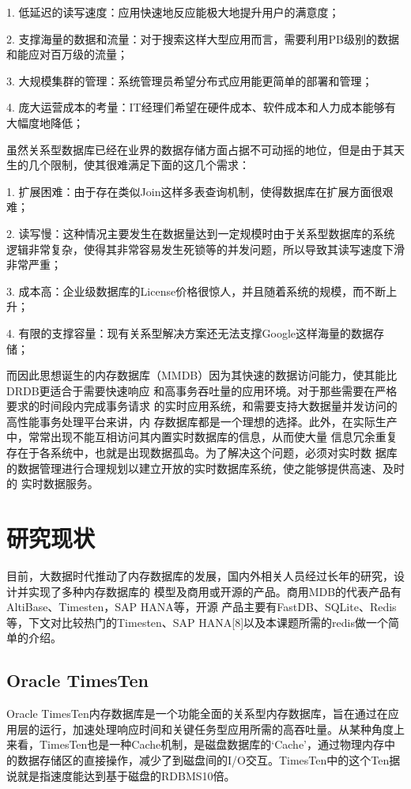 \documentclass[proposal]{zjutreport}
\begin{document}
1. 低延迟的读写速度：应用快速地反应能极大地提升用户的满意度；

2. 支撑海量的数据和流量：对于搜索这样大型应用而言，需要利用PB级别的数据和能应对百万级的流量；

3. 大规模集群的管理：系统管理员希望分布式应用能更简单的部署和管理；

4. 庞大运营成本的考量：IT经理们希望在硬件成本、软件成本和人力成本能够有大幅度地降低；

虽然关系型数据库已经在业界的数据存储方面占据不可动摇的地位，但是由于其天生的几个限制，使其很难满足下面的这几个需求：

1. 扩展困难：由于存在类似Join这样多表查询机制，使得数据库在扩展方面很艰难；

2. 读写慢：这种情况主要发生在数据量达到一定规模时由于关系型数据库的系统逻辑非常复杂，使得其非常容易发生死锁等的并发问题，所以导致其读写速度下滑非常严重；

3. 成本高：企业级数据库的License价格很惊人，并且随着系统的规模，而不断上升；

4. 有限的支撑容量：现有关系型解决方案还无法支撑Google这样海量的数据存储；

而因此思想诞生的内存数据库（MMDB）因为其快速的数据访问能力，使其能比DRDB更适合于需要快速响应
和高事务吞吐量的应用环境。对于那些需要在严格要求的时间段内完成事务请求
的实时应用系统，和需要支持大数据量并发访问的高性能事务处理平台来讲，内
存数据库都是一个理想的选择。此外，在实际生产中，常常出现不能互相访问其内置实时数据库的信息，从而使大量
信息冗余重复存在于各系统中，也就是出现数据孤岛。为了解决这个问题，必须对实时数
据库的数据管理进行合理规划以建立开放的实时数据库系统，使之能够提供高速、及时的
实时数据服务。

\section{研究现状}
目前，大数据时代推动了内存数据库的发展，国内外相关人员经过长年的研究，设计并实现了多种内存数据库的
模型及商用或开源的产品。商用MDB的代表产品有AltiBase、Timesten，SAP HANA等，开源
产品主要有FastDB、SQLite、Redis等，下文对比较热门的Timesten、SAP HANA[8]以及本课题所需的redis做一个简单的介绍。

\subsection{Oracle TimesTen}
Oracle TimesTen内存数据库是一个功能全面的关系型内存数据库，旨在通过在应用层的运行，加速处理响应时间和关键任务型应用所需的高吞吐量。从某种角度上来看，TimesTen也是一种Cache机制，是磁盘数据库的‘Cache’，通过物理内存中的数据存储区的直接操作，减少了到磁盘间的I/O交互。TimesTen中的这个Ten据说就是指速度能达到基于磁盘的RDBMS10倍。
\end{document}
